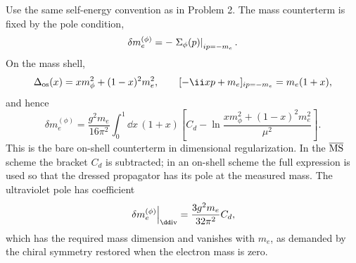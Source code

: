\begin{enumerate}
Use the same self-energy convention as in Problem 2.  The mass counterterm
is fixed by the pole condition,
\[
 \delta m_e^{(\phi)}
 =-\left.\Sigma_\phi(p)\right|_{i\sl p=-m_e}.
\]
On the mass shell,
\[
 \Delta_{\rm os}(x)=xm_\phi^2+(1-x)^2m_e^2,\qquad
 [-\ii x\sl p+m_e]_{i\sl p=-m_e}=m_e(1+x),
\]
and hence
\[
 \boxed{\;
 \delta m_e^{(\phi)}
 =\frac{g^2m_e}{16\pi^2}\int_0^1\dd x\,(1+x)
 \left[
 C_d-\ln\frac{xm_\phi^2+(1-x)^2m_e^2}{\mu^2}
 \right].
 \;}
\]
This is the bare on-shell counterterm in dimensional regularization.  In
the \(\overline{\rm MS}\) scheme the bracket \(C_d\) is subtracted; in an
on-shell scheme the full expression is used so that the dressed propagator
has its pole at the measured mass.  The ultraviolet pole has coefficient
\[
 \left.\delta m_e^{(\phi)}\right|_{\rm \dd iv}
 =\frac{3g^2m_e}{32\pi^2}C_d,
\]
which has the required mass dimension and vanishes with \(m_e\), as demanded
by the chiral symmetry restored when the electron mass is zero.
\end{enumerate}
